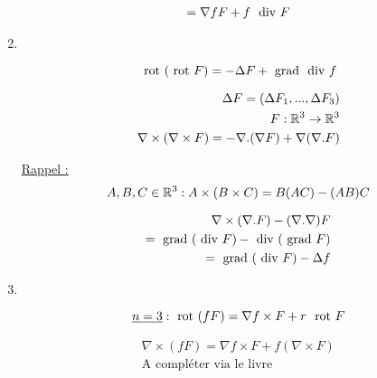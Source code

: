 \documentclass[12pt,a4paper]{article}
\begin{document}
\begin{enumerate}
\begin{align*}
				= \nabla f F + f\ \text{ div } F
			\end{align*}
	\item 	~\begin{boite}[0.6]
				\[\text{ rot }(\text{ rot } F) = -\Delta F + \text{ grad } \text{ div } f\]
			\end{boite}
			\begin{align*}
				\Delta F = (\Delta F_1,...,\Delta F_3)\\
				F : \mathbb{R}^3 \to \mathbb{R}^3\\
				\nabla \times (\nabla \times F) =-\nabla. (\nabla F) + \nabla (\nabla. F)
			\end{align*}
			\begin{boite}
				\uline{Rappel :} \[A,B,C \in \mathbb{R}^3 : A \times (B\times C) = B(AC) - (AB)C\]
			\end{boite}
			\begin{align*}
				\nabla \times (\nabla. F) - (\nabla. \nabla)F\\
				= \text{ grad }(\text{ div } F) - \text{ div }(\text{ grad } F)\\
				= \text{ grad }(\text{ div } F) - \Delta f
			\end{align*}
	\item 	~\begin{boite}[0.6]
				\[\uline{n=3} : \rot(fF) = \nabla f \times F + r\ \rot F\]
			\end{boite}
			\misenforme
			\begin{align*}
				\nabla \times (fF) =\nabla f \times F + f(\nabla \times F)\\
				\text{A compléter via le livre}
			\end{align*}						
			
\end{enumerate}
\end{document}
